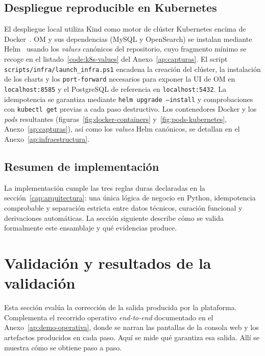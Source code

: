 \subsection{Despliegue reproducible en Kubernetes}\label{sec:implementacion-k8s}

El despliegue local utiliza Kind como motor de clúster Kubernetes encima de Docker~\cite{dockerOverview, kindDocs, kubernetesConcepts}. \ac{OM} y sus dependencias (MySQL y OpenSearch) se instalan mediante Helm~\cite{helmDocs} usando los \emph{values} canónicos del repositorio, cuyo fragmento mínimo se recoge en el listado~\ref{code:k8s-values} del Anexo~\ref{ap:capturas}. El script \texttt{scripts/infra/launch\_infra.ps1} encadena la creación del clúster, la instalación de los charts y los \texttt{port-forward} necesarios para exponer la \ac{UI} de \ac{OM} en \texttt{localhost:8585} y el PostgreSQL de referencia en \texttt{localhost:5432}. La idempotencia se garantiza mediante \texttt{helm upgrade --install} y comprobaciones con \texttt{kubectl get} previas a cada paso destructivo. Los contenedores Docker y los \emph{pods} resultantes (figuras~\ref{fig:docker-containers} y~\ref{fig:pods-kubernetes}, Anexo~\ref{ap:capturas}), así como los \emph{values} Helm canónicos, se detallan en el Anexo~\ref{ap:infraestructura}.

\subsection{Resumen de implementación}

La implementación cumple las tres reglas duras declaradas en la sección~\ref{cap:arquitectura}: una única lógica de negocio en Python, idempotencia comprobable y separación estricta entre datos técnicos, curación funcional y derivaciones automáticas. La sección siguiente describe cómo se valida formalmente este ensamblaje y qué evidencias produce.

\section{Validación y resultados de la validación}\label{cap:validacion}

Esta sección evalúa la corrección de la salida producida por la plataforma. Complementa el recorrido operativo \emph{end-to-end} documentado en el Anexo~\ref{ap:demo-operativa}, donde se narran las pantallas de la consola web y los artefactos producidos en cada paso. Aquí se mide qué garantiza esa salida. Allí se muestra cómo se obtiene paso a paso.

